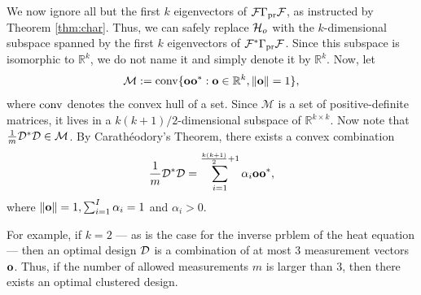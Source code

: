 We now ignore all but the first $k$ eigenvectors of $\mathcal{F} \Gamma_{\textup{pr}}
\mathcal{F}$, as instructed by Theorem \ref{thm:char}. Thus, we can safely
replace $\mathcal{H}_o$ with the $k$-dimensional subspace spanned by the first
$k$ eigenvectors of $\mathcal{F}^*\Gamma_{\textup{pr}}\mathcal{F}$. Since this subspace is
isomorphic to $\mathbb{R}^k$, we do not name it and simply denote it
by $\mathbb{R}^k$. Now, let
\begin{equation*}
  \mathcal{M} := \conv \{\meas \meas^* : \meas\in \mathbb{R}^k, \|\meas\|=1\},
\end{equation*}
where $\operatorname*{conv}$ denotes the convex hull of a set. Since $\mathcal{M}$ is
a set of positive-definite matrices, it lives in a
$k(k+1)/2$-dimensional subspace of $\mathbb{R}^{k\times k}$. Now note
that $\frac{1}{m}\mathcal{D}^*\mathcal{D} \in \mathcal{M}$. By Carath\'eodory's
Theorem, there exists a convex combination
\begin{equation*}
  \frac{1}{m} \opt^*\opt = \sum_{i=1}^{\frac{k(k+1)}{2} + 1} \alpha_i \meas\meas^*,
\end{equation*}
where $\|\mathbf{o}\|=1, \sum_{i=1}^I\alpha_i = 1$ and $\alpha_i > 0$.

For example, if $k=2$ --- as is the case for the inverse prblem of the
heat equation --- then an optimal design $\mathcal{D}$ is a combination of at
most $3$ measurement vectors $\mathbf{o}$. Thus, if the number of allowed
measurements $m$ is larger than $3$, then there exists an optimal
clustered design.

















